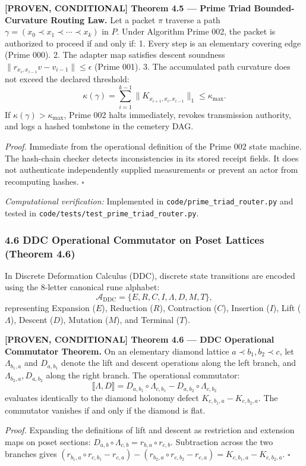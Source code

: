 \documentclass[
  english,
  10pt,
  a4paper,
]{article}
\providecommand{\llbracket}{\lBrack}
\providecommand{\rrbracket}{\rBrack}
\renewenvironment{quote}
  {\begin{leftbar}\small}
  {\end{leftbar}}
\begin{document}
\begin{quote}
\textbf{{[}PROVEN, CONDITIONAL{]} Theorem 4.5 --- Prime Triad
Bounded-Curvature Routing Law.} Let a packet \(\pi\) traverse a path
\(\gamma = (x_0 \prec x_1 \prec \cdots \prec x_k)\) in \(P\). Under
Algorithm Prime 002, the packet is authorized to proceed if and only if:
1. Every step is an elementary covering edge (Prime 000). 2. The adapter
map satisfies descent soundness
\(\|r_{x_{i}, x_{i-1}} v - v_{i-1}\| \le \epsilon\) (Prime 001). 3. The
accumulated path curvature does not exceed the declared threshold: \[
   \kappa(\gamma) = \sum_{i=1}^{k-1} \|K_{x_{i+1}, x_i, x_{i-1}}\|_1 \le \kappa_{\max}.
   \] If \(\kappa(\gamma) > \kappa_{\max}\), Prime 002 halts
immediately, revokes transmission authority, and logs a hashed tombstone
in the cemetery DAG.

\emph{Proof.} Immediate from the operational definition of the Prime 002
state machine. The hash-chain checker detects inconsistencies in its
stored receipt fields. It does not authenticate independently supplied
measurements or prevent an actor from recomputing hashes. \(\square\)
\end{quote}

\emph{Computational verification:} Implemented in
\nolinkurl{code/prime_triad_router.py} and tested in
\nolinkurl{code/tests/test_prime_triad_router.py}.

\subsubsection{4.6 DDC Operational Commutator on Poset Lattices (Theorem
4.6)}\label{ddc-operational-commutator-on-poset-lattices-theorem-4.6}

In Discrete Deformation Calculus (DDC), discrete state transitions are
encoded using the 8-letter canonical rune alphabet: \[
\mathcal{A}_{\mathrm{DDC}} = \{E, R, C, I, \Lambda, D, M, T\},
\] representing Expansion (\(E\)), Reduction (\(R\)), Contraction
(\(C\)), Insertion (\(I\)), Lift (\(\Lambda\)), Descent (\(D\)),
Mutation (\(M\)), and Terminal (\(T\)).

\begin{quote}
\textbf{{[}PROVEN, CONDITIONAL{]} Theorem 4.6 --- DDC Operational
Commutator Theorem.} On an elementary diamond lattice
\(a \prec b_1, b_2 \prec c\), let \(\Lambda_{b_1, a}\) and
\(D_{a, b_1}\) denote the lift and descent operations along the left
branch, and \(\Lambda_{b_2, a}, D_{a, b_2}\) along the right branch. The
operational commutator: \[
\llbracket \Lambda, D \rrbracket = D_{a, b_1} \circ \Lambda_{c, b_1} - D_{a, b_2} \circ \Lambda_{c, b_2}
\] evaluates identically to the diamond holonomy defect
\(K_{c, b_1, a} - K_{c, b_2, a}\). The commutator vanishes if and only
if the diamond is flat.

\emph{Proof.} Expanding the definitions of lift and descent as
restriction and extension maps on poset sections:
\(D_{a, b} \circ \Lambda_{c, b} = r_{b, a} \circ r_{c, b}\). Subtraction
across the two branches gives
\((r_{b_1, a} \circ r_{c, b_1} - r_{c, a}) - (r_{b_2, a} \circ r_{c, b_2} - r_{c, a}) = K_{c, b_1, a} - K_{c, b_2, a}\).
\(\square\)
\end{quote}
\end{document}
